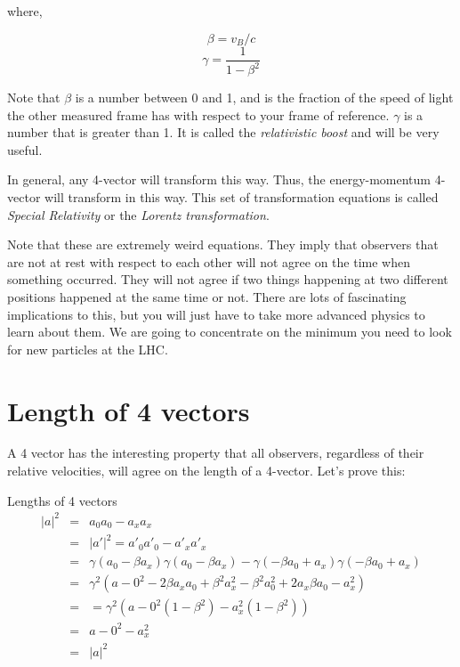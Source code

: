 \noindent where,

\begin{equation} \beta = v_B /c \end{equation}   	
\begin{equation} \gamma = \frac{1}{1- \beta^2} \end{equation}  


Note that $\beta$  is a number between 0 and 1, and is the fraction of the speed of light the other measured frame has with respect to your frame of reference.  $\gamma$  is a number that is greater than 1.  It is called the {\it relativistic boost} and will be very useful.

In general, any 4-vector will transform this way.  Thus, the energy-momentum 4-vector will transform in this way.  This set of transformation equations is called {\it Special Relativity} or the {\it Lorentz transformation}.

Note that these are extremely weird equations.  They imply that observers that are not at rest with respect to each other will not agree on the time when something occurred. They will not agree if two things happening at two different positions happened at the same time or not.  There are lots of fascinating implications to this, but you will just have to take more advanced physics to learn about them.  We are going to concentrate on the minimum you need to look for new particles at the LHC.

\section{Length of 4 vectors}

A 4 vector has the interesting property that all observers, regardless of their relative velocities, will agree on the length of a 4-vector.  Let's prove this:

Lengths of 4 vectors
\begin{eqnarray}
|a|^2 &=&  a_0 a_0 - a_x a_x  \nonumber \\
      &=&  |a'|^2 = a'_0 a'_0 - a'_x a'_x  \nonumber \\
      &=& \gamma (a_0 -\beta a_x) \gamma (a_0 -\beta a_x) - \gamma (-\beta a_0 +a_x ) \gamma (-\beta a_0 +a_x )  \nonumber \\
      &=&  \gamma^2 (a-0^2  -2 \beta a_x a_0  + \beta^2 a_x^2 - \beta^2 a_0^2  + 2 a_x \beta  a_0  - a_x^2)   \nonumber \\
      &=& =\gamma^2 ( a-0^2 (1-  \beta^2)  - a_x^2 (1-  \beta^2))   \nonumber \\
      &=&  a-0^2 - a_x^2  \nonumber  \\
      &=& |a|^2  
\end{eqnarray} 

